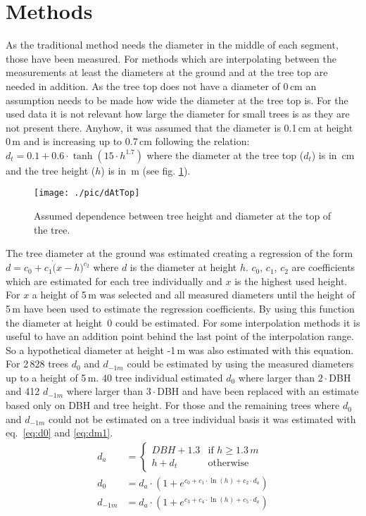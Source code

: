 \documentclass[twocolumn]{scrartcl}
\begin{document}
\section{Methods}

As the traditional method needs the diameter in the middle of each segment,
those have been measured. For methods which are interpolating between the
measurements at least the diameters at the ground and at the tree top are needed
in addition. As the tree top does not have a diameter of 0\,cm an assumption
needs to be made how wide the diameter at the tree top is. For the used data it
is not relevant how large the diameter for small trees is as they are not
present there. Anyhow, it was assumed that the diameter is 0.1\,cm at height
0\,m and is increasing up to 0.7\,cm following the relation: $d_t = 0.1 + 0.6
\cdot \tanh(15 \cdot h^{1.7})$ where the diameter at the tree top ($d_t$) is
in~cm and the tree height ($h$) is in~m (see fig. \ref{fig:dAtTop}).

\begin{figure}[htbp]
  \centering
  \texttt{[image: ./pic/dAtTop]}
  \caption{Assumed dependence between tree height and diameter at the top of the tree.}
  \label{fig:dAtTop}
\end{figure}

The tree diameter at the ground was estimated creating a regression of the form
$d = c_0 + c_1 \dot (x - h)^{c_2}$ where $d$ is the diameter at height $h$.
$c_0$, $c_1$, $c_2$ are coefficients which are estimated for each tree
individually and $x$ is the highest used height. For $x$ a height of 5\,m was
selected and all measured diameters until the height of 5\,m have been used to
estimate the regression coefficients. By using this function the diameter at
height~0 could be estimated. For some interpolation methods it is useful to have
an addition point behind the last point of the interpolation range. So a
hypothetical diameter at height -1\,m was also estimated with this equation. For
2\,828 trees $d_0$ and $d_{-1m}$ could be estimated by using the measured
diameters up to a height of 5\,m. 40 tree individual estimated $d_0$ where
larger than $2\cdot$DBH and 412 $d_{-1m}$ where larger than $3\cdot$DBH and have
been replaced with an estimate based only on DBH and tree height. For those and
the remaining trees where $d_0$ and $d_{-1m}$ could not be estimated on a tree
individual basis it was estimated with eq.~\ref{eq:d0} and \ref{eq:dm1}.
\begin{align}
  d_{a} & = \begin{cases}
    DBH + 1.3 & \text{if } h \geq 1.3\,m\\
    h + d_t   & \text{otherwise}
\end{cases}\\
\label{eq:d0}
d_0 & = d_{a} \cdot (1 + e^{c_0 + c_1\cdot \ln(h) + c_2\cdot d_{a}})\\
\label{eq:dm1}
d_{-1m} & = d_{a} \cdot (1 + e^{c_3 + c_4\cdot \ln(h) + c_5\cdot d_{a}})
\end{align}
\end{document}
